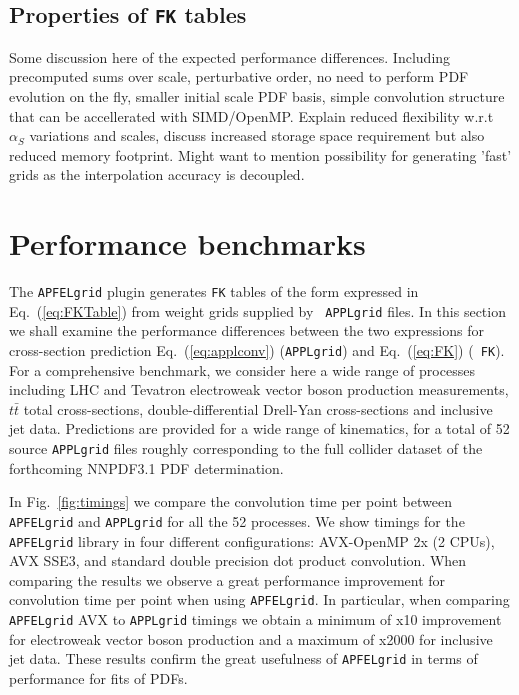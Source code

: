 \documentclass[preprint,12pt]{elsarticle}
\begin{document}
\subsection{Properties of {\tt FK} tables}
Some discussion here of the expected performance differences. Including precomputed sums over scale, perturbative order, no need to perform PDF evolution on the fly, smaller initial scale PDF basis, simple convolution structure that can be accellerated with SIMD/OpenMP.
Explain reduced flexibility w.r.t $\alpha_S$ variations and scales, discuss increased storage space requirement but also reduced memory footprint.
Might want to mention possibility for generating 'fast' grids as the interpolation accuracy is decoupled.

\section{Performance benchmarks}
\label{sec:benchmark}

The {\tt APFELgrid} plugin generates {\tt FK} tables of the form
expressed in Eq.~(\ref{eq:FKTable}) from weight grids supplied by {\tt
  APPLgrid} files. In this section we shall examine the performance
differences between the two expressions for cross-section prediction
Eq.~(\ref{eq:applconv}) ({\tt APPLgrid}) and Eq.~(\ref{eq:FK}) ({\tt
  FK}).
%
For a comprehensive benchmark, we consider here a wide range of
processes including LHC and Tevatron electroweak vector boson
production measurements, $t\bar{t}$ total cross-sections,
double-differential Drell-Yan cross-sections and inclusive jet
data. Predictions are provided for a wide range of kinematics, for a
total of 52 source {\tt APPLgrid} files roughly corresponding to the
full collider dataset of the forthcoming NNPDF3.1 PDF determination.

In Fig.~\ref{fig:timings} we compare the convolution time per point
between {\tt APFELgrid} and {\tt APPLgrid} for all the 52
processes. We show timings for the {\tt APFELgrid} library in four
different configurations: AVX-OpenMP 2x (2 CPUs), AVX SSE3, and
standard double precision dot product convolution. When comparing the
results we observe a great performance improvement for convolution
time per point when using {\tt APFELgrid}. In particular, when
comparing {\tt APFELgrid} AVX to {\tt APPLgrid} timings we obtain a
minimum of x10 improvement for electroweak vector boson production and
a maximum of x2000 for inclusive jet data. These results confirm the
great usefulness of {\tt APFELgrid} in terms of performance for fits
of PDFs.
\end{document}
